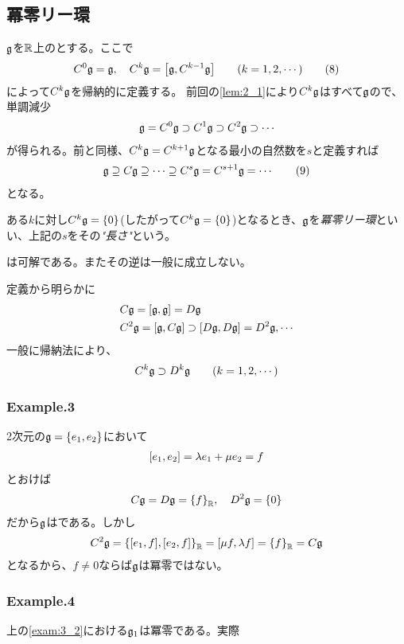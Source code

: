 \documentclass[../main]{subfiles}
\begin{document}
\subsection{冪零リー環}
\begin{definition}[冪零リー環]\label{Def:nil_Lie_alg}
  $\mathfrak{g}$を{}$\mathbb{R}$上の{}とする。ここで
  \begin{align*}
    C^{0}\g=\g\qc C^{k}\g=\comm{\g}{C^{k-1}\g} \qq{} (k=1,2,\cdots)
    \tag{8}\label{eq:3_(8)}
  \end{align*}
  によって$C^{k}\mathfrak{g}$を帰納的に定義する。
  前回の\cref{lem:2_1}により$C^{k}\mathfrak{g}$はすべて$\mathfrak{g}$の{}で、単調減少{\列}
  \begin{align*}
    \mathfrak{g}=C^{0}\mathfrak{g}\supset C^{1}\mathfrak{g} \supset C^{2}\mathfrak{g} \supset \cdots
  \end{align*}
  が得られる。前と同様、$C^{k}\mathfrak{g}=C^{k+1}\mathfrak{g}$となる最小の自然数を$s$と定義すれば
  \begin{align*}
    \mathfrak{g}\supseteq C\mathfrak{g} \supseteq \cdots \supseteq C^{s}\mathfrak{g} = C^{s+1}\mathfrak{g} = \cdots
    \tag{9}\label{eq:3_(9)}
  \end{align*}
  となる。

  ある$k$に対し$C^{k}\mathfrak{g}=\qty{0}$(したがって$C^{k}\mathfrak{g}=\qty{0}$)となるとき、$\mathfrak{g}$を\emph{冪零リー環}といい、上記の$s$をその\emph{"長さ"}という。
\end{definition}

\begin{theorem}
  {}は可解である。またその逆は一般に成立しない。
\end{theorem}

\begin{Proof}
  定義から明らかに
  \begin{align*}
    & C\g=\comm{\g}{\g}=D\g\\
    & C^{2}\g = \comm{\g}{C\g}\supset\comm{D\g}{D\g}=D^2\g, \cdots
  \end{align*}
  一般に帰納法により、
  \begin{align*}
    C^{k}\g \supset D^{k}\g \qq{} (k=1,2,\cdots)
  \end{align*}
\end{Proof}

\subsubsection*{Example.3}
\begin{remark}

2次元の{}$\mathfrak{g}=\qty{e_{1},e_{2}}$において
\begin{align*}
  \comm{e_{1}}{e_{2}}=\lambda e_{1} + \mu e_{2} = f
\end{align*}
とおけば
\begin{align*}
  C\g=D\g=\qty{f}_{\R}\qc D^{2}\g=\qty{0}
\end{align*}
だから$\mathfrak{g}$は{}である。しかし
\begin{align*}
  C^{2}\g=\qty{\comm{e_{1}}{f},\comm{e_{2}}{f}}_{\R}=\comm{\mu f}{\lambda f} = \qty{f}_{\R} = C\g
\end{align*}
となるから、$f\neq 0$ならば$\mathfrak{g}$は冪零ではない。
\end{remark}

\subsubsection*{Example.4}
上の\cref{exam:3_2}における$\mathfrak{g}_1$は冪零である。実際
\end{document}
